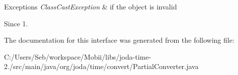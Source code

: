 \begin{DoxyExceptions}{Exceptions}
{\em Class\-Cast\-Exception} & if the object is invalid \\
\hline
\end{DoxyExceptions}
\begin{DoxySince}{Since}
1. 
\end{DoxySince}


The documentation for this interface was generated from the following file\-:\begin{DoxyCompactItemize}
\item 
C\-:/\-Users/\-Seb/workspace/\-Mobii/libs/joda-\/time-\/2./src/main/java/org/joda/time/convert/Partial\-Converter.\-java\end{DoxyCompactItemize}
